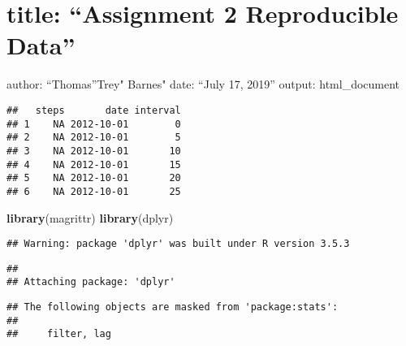 \documentclass[]{article}
\title{}
\author{}
\date{}
\newenvironment{Shaded}{\begin{snugshade}}{\end{snugshade}}
\newcommand{\KeywordTok}[1]{\textcolor[rgb]{0.13,0.29,0.53}{\textbf{#1}}}
\newcommand{\DataTypeTok}[1]{\textcolor[rgb]{0.13,0.29,0.53}{#1}}
\newcommand{\StringTok}[1]{\textcolor[rgb]{0.31,0.60,0.02}{#1}}
\newcommand{\OtherTok}[1]{\textcolor[rgb]{0.56,0.35,0.01}{#1}}
\newcommand{\NormalTok}[1]{#1}
\begin{document}
\section{\texorpdfstring{title: ``Assignment 2 Reproducible
Data''}{title: Assignment 2 Reproducible Data}}\label{title-assignment-2-reproducible-data}

author: ``Thomas''Trey" Barnes" date: ``July 17, 2019'' output:
html\_document

\begin{Shaded}
\end{Shaded}

\begin{verbatim}
##   steps       date interval
## 1    NA 2012-10-01        0
## 2    NA 2012-10-01        5
## 3    NA 2012-10-01       10
## 4    NA 2012-10-01       15
## 5    NA 2012-10-01       20
## 6    NA 2012-10-01       25
\end{verbatim}

\begin{Shaded}
\begin{Highlighting}[]
\KeywordTok{library}\NormalTok{(magrittr)}
\KeywordTok{library}\NormalTok{(dplyr)}
\end{Highlighting}
\end{Shaded}

\begin{verbatim}
## Warning: package 'dplyr' was built under R version 3.5.3
\end{verbatim}

\begin{verbatim}
## 
## Attaching package: 'dplyr'
\end{verbatim}

\begin{verbatim}
## The following objects are masked from 'package:stats':
## 
##     filter, lag
\end{verbatim}
\end{document}
